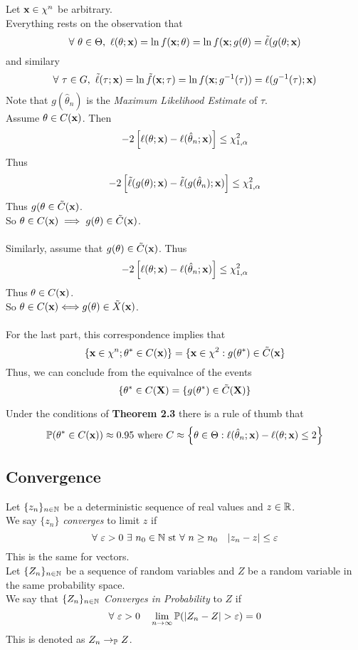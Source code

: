\documentclass[11pt,a4paper]{article}
\begin{document}
Let $\textbf{x}\in\chi^n$ be arbitrary.\\
Everything rests on the observation that
$$\forall\ \theta\in\Theta,\ \ell(\theta;\textbf{x})=\ln f(\textbf{x};\theta)=\ln f(\textbf{x};g(\theta)=\tilde\ell(g(\theta;\textbf{x})$$
and similary
$$\forall\ \tau\in G,\ \tilde\ell(\tau;\x)=\ln \tilde{f}(\x;\tau)=\ln f(\x;g^{-1}(\tau))=\ell(g^{-1}(\tau);\x)$$
Note that $g(\hat\theta_n)$ is the \textit{Maximum Likelihood Estimate} of $\tau$.\\
Assume $\theta\in C(\textbf{x})$. Then
$$-2\left[\ell(\theta;\textbf{x})-\ell(\hat\theta_n;\textbf{x})\right]\leq\chi^2_{1,\alpha}$$
Thus
$$-2\left[\tilde\ell(g(\theta);\textbf{x})-\tilde\ell(g(\hat\theta_n);\textbf{x})\right]\leq\chi^2_{1,\alpha}$$
Thus $g(\theta\in\tilde{C}(\textbf{x})$.\\
So $\theta\in C(\textbf{x})\implies g(\theta)\in\tilde{C}(\textbf{x})$.\\
\\
Similarly, assume that $g(\theta)\in\tilde{C}(\textbf{x})$. Thus
$$-2\left[\ell(\theta;\textbf{x})-\ell(\hat\theta_n;\textbf{x})\right]\leq\chi^2_{1,\alpha}$$
Thus $\theta\in C(\textbf{x})$.\\
So $\theta\in C(\textbf{x})\Longleftrightarrow g(\theta)\in\tilde{X}(\textbf{x})$.\\
\\
For the last part, this correspondence implies that
$$\{\textbf{x}\in\chi^n;\theta^*\in C(\textbf{x})\}=\{\textbf{x}\in\chi^2:g(\theta^*)\in\tilde{C}(\textbf{x}\}$$
Thus, we can conclude from the equivalnce of the events
$$\{\theta^*\in C(\textbf{X})=\{g(\theta^*)\in\tilde{C}(\textbf{X})\}$$

Under the conditions of \textbf{Theorem 2.3} there is a rule of thumb that
$$\mathbb{P}(\theta^*\in C(\textbf{x}))\approx0.95\text{ where }C\approx\left\{\theta\in\Theta:\ell(\hat\theta_n;\textbf{x})-\ell(\theta;\textbf{x})\leq2\right\}$$

\subsection{Convergence}

Let $\{z_n\}_{n\in\mathbb{N}}$ be a deterministic sequence of real values and $z\in\mathbb{R}$.\\
We say $\{z_n\}$ \textit{converges} to limit $z$ if
$$\forall\ \varepsilon>0\ \exists\ n_0\in\nats\text{ st }\forall\ n\geq n_0\quad |z_n-z|\leq\varepsilon$$
\nb This is the same for vectors.\\

Let $\{Z_n\}_{n\in\mathbb{N}}$ be a sequence of random variables and $Z$ be a random variable in the same probability space.\\
We say that $\{Z_n\}_{n\in\mathbb{N}}$ \textit{Converges in Probability} to $Z$ if
$$\forall\ \varepsilon>0\quad\lim_{n\to\infty}\prob(|Z_n-Z|>\varepsilon)=0$$
\nb This is denoted as $Z_n\to_{\mathbb{P}} Z$.\\
\end{document}

